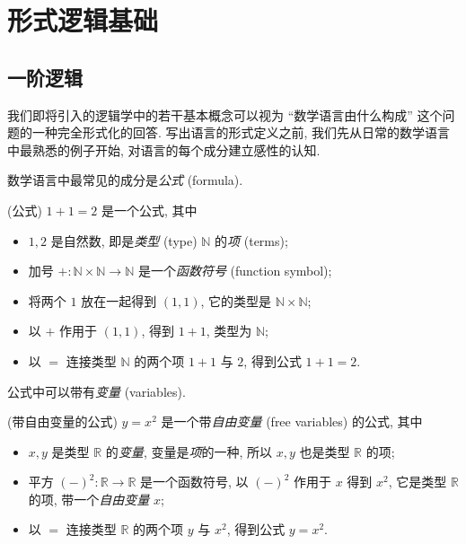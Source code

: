 \chapter{形式逻辑基础}

\label{logic-appendix}

\minitoc


\section{一阶逻辑}

\label{first-order-languages}

我们即将引入的逻辑学中的若干基本概念可以视为 ``数学语言由什么构成'' 这个问题的一种完全形式化的回答. 写出语言的形式定义之前, 我们先从日常的数学语言中最熟悉的例子开始, 对语言的每个成分建立感性的认知.


数学语言中最常见的成分是\emph{公式} (formula).

\begin{example}
	{(公式)}
	$1+1=2$ 是一个公式, 其中
	\begin{itemize}
		\item $1,2$ 是自然数, 即是\emph{类型} (type) $\mathbb{N}$ 的\emph{项} (terms);
		\item 加号 $+ \colon \mathbb{N}\times\mathbb{N} \to \mathbb{N}$ 是一个\emph{函数符号} (function symbol);
		\item 将两个 $1$ 放在一起得到 $(1,1)$, 它的类型是 $\mathbb{N}\times\mathbb{N}$;
		\item 以 $+$ 作用于 $(1,1)$, 得到 $1+1$, 类型为 $\mathbb{N}$;
		\item 以 $=$ 连接类型 $\mathbb{N}$ 的两个项 $1+1$ 与 $2$, 得到公式 $1+1=2$. %
	\end{itemize}
\end{example}

公式中可以带有\emph{变量} (variables).

\begin{example}
	{(带自由变量的公式)}
	$y=x^2$ 是一个带\emph{自由变量} (free variables) 的公式, 其中
	\begin{itemize}
		\item $x,y$ 是类型 $\mathbb{R}$ 的\emph{变量}, 变量是\emph{项}的一种, 所以 $x,y$ 也是类型 $\mathbb{R}$ 的项;
		\item 平方 $(-)^2 \colon \mathbb{R} \to \mathbb{R}$ 是一个函数符号, 以 $(-)^2$ 作用于 $x$ 得到 $x^2$, 它是类型 $\mathbb{R}$ 的项, 带一个\emph{自由变量} $x$;
		\item 以 $=$ 连接类型 $\mathbb{R}$ 的两个项 $y$ 与 $x^2$, 得到公式 $y=x^2$. %
	\end{itemize}
\end{example}

